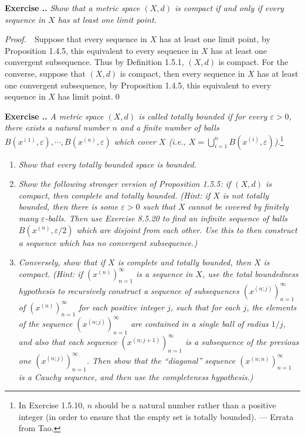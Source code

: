 \documentclass{book}
\newcommand{\pff}{\vspace{.25em}\noindent\emph{Proof.}~~}
\newcounter{Exercise}[section]
\renewcommand{\theExercise}{\thesection.\arabic{Exercise}.}
\newcommand{\new}{\vspace{1.5em}\noindent\textbf{Exercise \stepcounter{Exercise}\textbf{\theExercise}} }
\begin{document}
\new\emph{Show that a metric space $(X,d)$ is compact if and only if every sequence in $X$ has at least one limit point.}

\pff Suppose that every sequence in $X$ has at least one limit point, by Proposition 1.4.5, this equivalent to every sequence in $X$ has at least one convergent subsequence. Thus by Definition 1.5.1, $(X,d)$ is compact. For the converse, suppose that $(X,d)$ is compact, then every sequence in $X$ has at least one convergent subsequence, by Proposition 1.4.5, this equivalent to every sequence in $X$ has limit point.\qed

\new\emph{A metric space $(X,d)$ is called \textnormal{totally bounded} if for every $\varepsilon>0$, there exists a natural number $n$ and a finite number of balls $B(x^{(1)},\varepsilon),\cdots, B(x^{(n)},\varepsilon)$ which cover $X$ (i.e., $X=\bigcup_{i=1}^{n}B(x^{(i)},\varepsilon)$).}\footnote{In Exercise 1.5.10, $n$ should be a natural number rather than a positive integer (in order to ensure that the empty set is totally bounded). --- Errata from Tao.}
\begin{enumerate}
    \item \emph{Show that every totally bounded space is bounded.}
    \item \emph{Show the following stronger version of Proposition 1.5.5: if $(X,d)$ is compact, then complete and totally bounded. (Hint: if $X$ is not totally bounded, then there is some $\varepsilon>0$ such that $X$ cannot be covered by finitely many $\varepsilon$-balls. Then use Exercise 8.5.20 to find an infinite sequence of balls $B(x^{(n)},\varepsilon/2)$ which are disjoint from each other. Use this to then construct a sequence which has no convergent subsequence.)}
    \item \emph{Conversely, show that if $X$ is complete and totally bounded, then $X$ is compact. (Hint: if $(x^{(n)})_{n=1}^{\infty}$ is a sequence in $X$, use the total boundedness hypothesis to recursively construct a sequence of subsequences $(x^{(n;j)})_{n=1}^{\infty}$ of $(x^{(n)})_{n=1}^{\infty}$ for each positive integer $j$, such that for each $j$, the elements of the sequence $(x^{(n;j)})_{n=1}^{\infty}$ are contained in a single ball of radius $1/j$, and also that each sequence $(x^{(n;j+1)})_{n=1}^{\infty}$ is a subsequence of the previous one $(x^{(n;j)})_{n=1}^{\infty}$. Then show that the ``diagonal'' sequence $(x^{(n;n)})_{n=1}^{\infty}$ is a Cauchy sequence, and then use the completeness hypothesis.)}
\end{enumerate}
\end{document}
